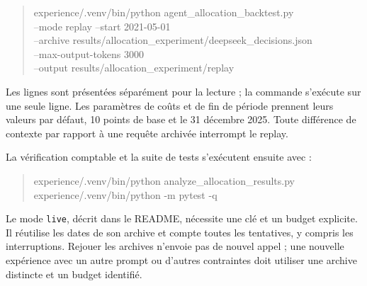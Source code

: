 \begin{quote}\small\ttfamily
experience/.venv/bin/python agent\_allocation\_backtest.py\\
\hspace*{1em}--mode replay --start 2021-05-01\\
\hspace*{1em}--archive results/allocation\_experiment/deepseek\_decisions.json\\
\hspace*{1em}--max-output-tokens 3000\\
\hspace*{1em}--output results/allocation\_experiment/replay
\end{quote}
Les lignes sont présentées séparément pour la lecture ; la commande s'exécute sur une seule ligne. Les paramètres de coûts et de fin de période prennent leurs valeurs par défaut, 10 points de base et le 31 décembre 2025. Toute différence de contexte par rapport à une requête archivée interrompt le replay.

La vérification comptable et la suite de tests s'exécutent ensuite avec :
\begin{quote}\small\ttfamily
experience/.venv/bin/python analyze\_allocation\_results.py\\[0.3em]
experience/.venv/bin/python -m pytest -q
\end{quote}

Le mode \texttt{live}, décrit dans le README, nécessite une clé et un budget explicite. Il réutilise les dates de son archive et compte toutes les tentatives, y compris les interruptions. Rejouer les archives n'envoie pas de nouvel appel ; une nouvelle expérience avec un autre prompt ou d'autres contraintes doit utiliser une archive distincte et un budget identifié.
